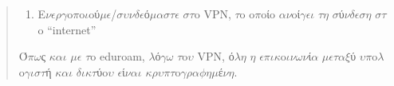 \documentclass[a4paper,11pt,english]{sphinxmanual}
\begin{document}
\begin{quote}
\begin{enumerate}
\item {} 
E\(\nu\)\(\epsilon\)\(\rho\)\(\gamma\)o\(\pi\)o\(\iota\)oύ\(\mu\)\(\epsilon\)/\(\sigma\)\(\upsilon\)\(\nu\)\(\delta\)\(\epsilon\)ό\(\mu\)\(\alpha\)\(\sigma\)\(\tau\)\(\epsilon\) \(\sigma\)\(\tau\)o VPN, \(\tau\)o o\(\pi\)oίo \(\alpha\)\(\nu\)oί\(\gamma\)\(\epsilon\)\(\iota\) \(\tau\)\(\eta\) \(\sigma\)ύ\(\nu\)\(\delta\)\(\epsilon\)\(\sigma\)\(\eta\) \(\sigma\)\(\tau\)o “internet”

\end{enumerate}

Ό\(\pi\)\(\omega\)ς \(\kappa\)\(\alpha\)\(\iota\) \(\mu\)\(\epsilon\) \(\tau\)o eduroam, \(\lambda\)ό\(\gamma\)\(\omega\) \(\tau\)o\(\upsilon\) VPN, ό\(\lambda\)\(\eta\) \(\eta\) \(\epsilon\)\(\pi\)\(\iota\)\(\kappa\)o\(\iota\)\(\nu\)\(\omega\)\(\nu\)ί\(\alpha\) \(\mu\)\(\epsilon\)\(\tau\)\(\alpha\)\(\xi\)ύ \(\upsilon\)\(\pi\)o\(\lambda\)o\(\gamma\)\(\iota\)\(\sigma\)\(\tau\)ή \(\kappa\)\(\alpha\)\(\iota\) \(\delta\)\(\iota\)\(\kappa\)\(\tau\)ύo\(\upsilon\) \(\epsilon\)ί\(\nu\)\(\alpha\)\(\iota\) \(\kappa\)\(\rho\)\(\upsilon\)\(\pi\)\(\tau\)o\(\gamma\)\(\rho\)\(\alpha\)\(\phi\)\(\eta\)\(\mu\)έ\(\nu\)\(\eta\).
\end{quote}
\end{document}
